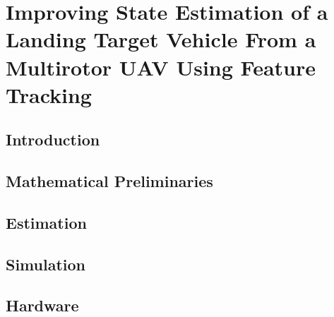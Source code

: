 
\chapter[Improving State Estimation of a Landing Target Vehicle
From a Multirotor UAV Using Feature Tracking]{Improving State Estimation of a
  Landing Target Vehicle From a Multirotor UAV Using Feature
Tracking\protect\footnotemark}
\label{chp:estimation_paper}

\graphicspath{{estimation_paper/}}

\section{Introduction} \label{sec:intro}



\section{Mathematical Preliminaries} \label{sec:model}




\section{Estimation} \label{sec:estimation}





\section{Simulation} \label{sec:est_paper_simulation}


\section{Hardware} \label{sec:est_paper_hardware}







